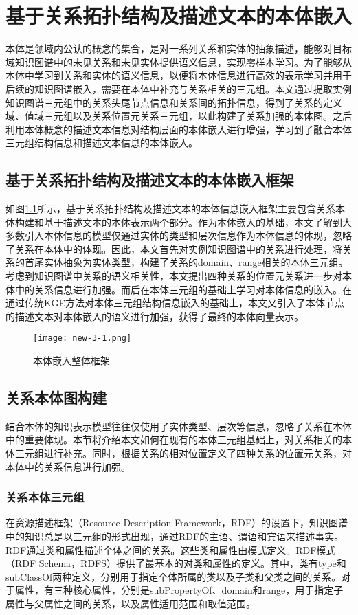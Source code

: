 \chapter{基于关系拓扑结构及描述文本的本体嵌入}
本体是领域内公认的概念的集合，是对一系列关系和实体的抽象描述，能够对目标域知识图谱中的未见关系和未见实体提供语义信息，实现零样本学习。为了能够从本体中学习到关系和实体的语义信息，以便将本体信息进行高效的表示学习并用于后续的知识图谱嵌入，需要在本体中补充与关系相关的三元组。本文通过提取实例知识图谱三元组中的关系头尾节点信息和关系间的拓扑信息，得到了关系的定义域、值域三元组以及关系位置元关系三元组，以此构建了关系加强的本体图。之后利用本体概念的描述文本信息对结构层面的本体嵌入进行增强，学习到了融合本体三元组结构信息和描述文本信息的本体嵌入。

\section{基于关系拓扑结构及描述文本的本体嵌入框架}
如图\ref{fig:new-3-1}所示，基于关系拓扑结构及描述文本的本体信息嵌入框架主要包含关系本体构建和基于描述文本的本体表示两个部分。作为本体嵌入的基础，本文了解到大多数引入本体信息的模型仅通过实体的类型和层次信息作为本体信息的体现，忽略了关系在本体中的体现。因此，本文首先对实例知识图谱中的关系进行处理，将关系的首尾实体抽象为实体类型，构建了关系的domain、range相关的本体三元组。考虑到知识图谱中关系的语义相关性，本文提出四种关系的位置元关系进一步对本体中的关系信息进行加强。而后在本体三元组的基础上学习对本体信息的嵌入。在通过传统KGE方法对本体三元组结构信息嵌入的基础上，本文又引入了本体节点的描述文本对本体嵌入的语义进行加强，获得了最终的本体向量表示。
\begin{figure}[h]
  \centering
  \texttt{[image: new-3-1.png]}
  \caption{本体嵌入整体框架}
  \label{fig:new-3-1}
\end{figure}

\section{关系本体图构建}
结合本体的知识表示模型往往仅使用了实体类型、层次等信息，忽略了关系在本体中的重要体现。本节将介绍本文如何在现有的本体三元组基础上，对关系相关的本体三元组进行补充。同时，根据关系的相对位置定义了四种关系的位置元关系，对本体中的关系信息进行加强。

\subsection{关系本体三元组}
在资源描述框架（Resource Description Framework，RDF）的设置下，知识图谱中的知识总是以三元组的形式出现，通过RDF的主语、谓语和宾语来描述事实。RDF通过类和属性描述个体之间的关系。这些类和属性由模式定义。RDF模式（RDF Schema，RDFS）提供了最基本的对类和属性的定义。其中，类有type和subClassOf两种定义，分别用于指定个体所属的类以及子类和父类之间的关系。对于属性，有三种核心属性，分别是subPropertyOf、domain和range，用于指定子属性与父属性之间的关系，以及属性适用范围和取值范围。

